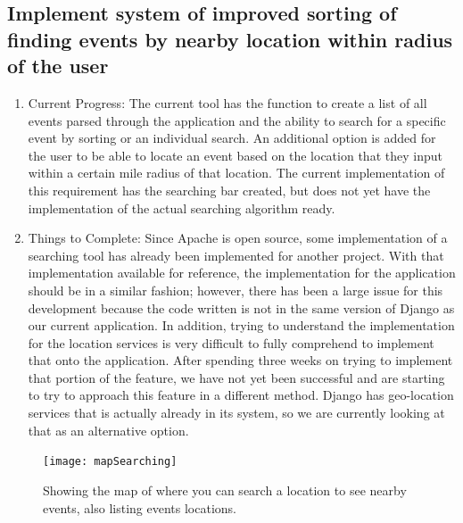 \documentclass[letterpaper,10pt,onecolumn]{IEEEtran} %
\begin{document}
\subsection{Implement system of improved sorting of finding events by nearby location within radius of the user}
\begin{enumerate}[label*=\arabic*.]
\item Current Progress: The current tool has the function to create a list of all events parsed through the application and the ability to search for a specific event by sorting or an individual search. An additional option is added for the user to be able to locate an event based on the location that they input within a certain mile radius of that location. The current implementation of this requirement has the searching bar created, but does not yet have the implementation of the actual searching algorithm ready.

\item Things to Complete: Since Apache is open source, some implementation of a searching tool has already been implemented for another project. With that implementation available for reference, the implementation for the application should be in a similar fashion; however, there has been a large issue for this development because the code written is not in the same version of Django as our current application. In addition, trying to understand the implementation for the location services is very difficult to fully comprehend to implement that onto the application. After spending three weeks on trying to implement that portion of the feature, we have not yet been successful and are starting to try to approach this feature in a different method. Django has geo-location services that is actually already in its system, so we are currently looking at that as an alternative option.
\end{enumerate}

\begin{figure}[htp]
  \begin{center}
  
  \texttt{[image: mapSearching]}
  \centering
  \caption{Showing the map of where you can search a location to see nearby events, also listing events locations. }

  \end{center}
\end{figure}
\end{document}
